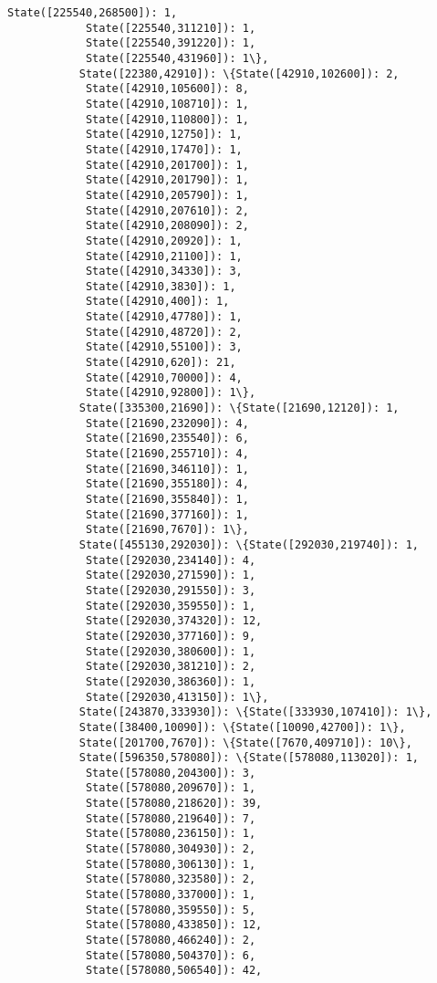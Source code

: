 \documentclass[11pt]{article}
\begin{document}
\begin{Verbatim}[commandchars=\\\{\}]
            State([225540,268500]): 1,
            State([225540,311210]): 1,
            State([225540,391220]): 1,
            State([225540,431960]): 1\},
           State([22380,42910]): \{State([42910,102600]): 2,
            State([42910,105600]): 8,
            State([42910,108710]): 1,
            State([42910,110800]): 1,
            State([42910,12750]): 1,
            State([42910,17470]): 1,
            State([42910,201700]): 1,
            State([42910,201790]): 1,
            State([42910,205790]): 1,
            State([42910,207610]): 2,
            State([42910,208090]): 2,
            State([42910,20920]): 1,
            State([42910,21100]): 1,
            State([42910,34330]): 3,
            State([42910,3830]): 1,
            State([42910,400]): 1,
            State([42910,47780]): 1,
            State([42910,48720]): 2,
            State([42910,55100]): 3,
            State([42910,620]): 21,
            State([42910,70000]): 4,
            State([42910,92800]): 1\},
           State([335300,21690]): \{State([21690,12120]): 1,
            State([21690,232090]): 4,
            State([21690,235540]): 6,
            State([21690,255710]): 4,
            State([21690,346110]): 1,
            State([21690,355180]): 4,
            State([21690,355840]): 1,
            State([21690,377160]): 1,
            State([21690,7670]): 1\},
           State([455130,292030]): \{State([292030,219740]): 1,
            State([292030,234140]): 4,
            State([292030,271590]): 1,
            State([292030,291550]): 3,
            State([292030,359550]): 1,
            State([292030,374320]): 12,
            State([292030,377160]): 9,
            State([292030,380600]): 1,
            State([292030,381210]): 2,
            State([292030,386360]): 1,
            State([292030,413150]): 1\},
           State([243870,333930]): \{State([333930,107410]): 1\},
           State([38400,10090]): \{State([10090,42700]): 1\},
           State([201700,7670]): \{State([7670,409710]): 10\},
           State([596350,578080]): \{State([578080,113020]): 1,
            State([578080,204300]): 3,
            State([578080,209670]): 1,
            State([578080,218620]): 39,
            State([578080,219640]): 7,
            State([578080,236150]): 1,
            State([578080,304930]): 2,
            State([578080,306130]): 1,
            State([578080,323580]): 2,
            State([578080,337000]): 1,
            State([578080,359550]): 5,
            State([578080,433850]): 12,
            State([578080,466240]): 2,
            State([578080,504370]): 6,
            State([578080,506540]): 42,

\end{Verbatim}
\end{document}
